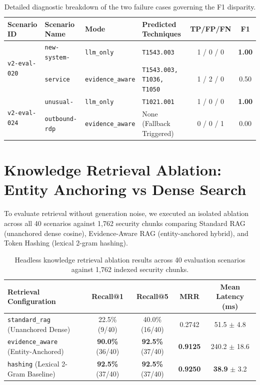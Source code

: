 \begin{table}[!htbp]
\centering
\caption{Detailed diagnostic breakdown of the two failure cases governing the F1 disparity.}
\label{tab:failure_case_breakdown}
\footnotesize
\setlength{\tabcolsep}{3.5pt}
\begin{tabularx}{\textwidth}{@{}l p{2.6cm} l X c c@{}}
\toprule
\textbf{Scenario ID} & \textbf{Scenario Name} & \textbf{Mode} & \textbf{Predicted Techniques} & \textbf{TP/FP/FN} & \textbf{F1} \\
\midrule
\multirow{2}{*}{\texttt{v2-eval-020}} & \texttt{new-system-} & \texttt{llm\_only} & \texttt{T1543.003} & 1 / 0 / 0 & \textbf{1.00} \\
    & \texttt{service} & \texttt{evidence\_aware} & \texttt{T1543.003, T1036, T1050} & 1 / 2 / 0 & 0.50 \\
\midrule
\multirow{2}{*}{\texttt{v2-eval-024}} & \texttt{unusual-} & \texttt{llm\_only} & \texttt{T1021.001} & 1 / 0 / 0 & \textbf{1.00} \\
    & \texttt{outbound-rdp} & \texttt{evidence\_aware} & None (Fallback Triggered) & 0 / 0 / 1 & 0.00 \\
\bottomrule
\end{tabularx}
\end{table}

\section{Knowledge Retrieval Ablation: Entity Anchoring vs Dense Search}
\label{sec:retrieval_ablation_results}
To evaluate retrieval without generation noise, we executed an isolated ablation across all 40 scenarios against 1,762 security chunks comparing Standard RAG (unanchored dense cosine), Evidence-Aware RAG (entity-anchored hybrid), and Token Hashing (lexical 2-gram hashing).

\begin{table}[!htbp]
\centering
\caption{Headless knowledge retrieval ablation results across 40 evaluation scenarios against 1,762 indexed security chunks.}
\label{tab:retrieval_ablation_metrics}
\footnotesize
\setlength{\tabcolsep}{4.5pt}
\begin{tabularx}{\textwidth}{@{}X c c c c@{}}
\toprule
\textbf{Retrieval Configuration} & \textbf{Recall@1} & \textbf{Recall@5} & \textbf{MRR} & \textbf{Mean Latency (ms)} \\
\midrule
\texttt{standard\_rag} (Unanchored Dense) & 22.5\% (9/40) & 40.0\% (16/40) & 0.2742 & 51.5 $\pm$ 4.8 \\
\texttt{evidence\_aware} (Entity-Anchored) & \textbf{90.0\%} (36/40) & \textbf{92.5\%} (37/40) & \textbf{0.9125} & 240.2 $\pm$ 18.6 \\
\texttt{hashing} (Lexical 2-Gram Baseline) & \textbf{92.5\%} (37/40) & \textbf{92.5\%} (37/40) & \textbf{0.9250} & \textbf{38.9} $\pm$ 3.2 \\
\bottomrule
\end{tabularx}
\end{table}

